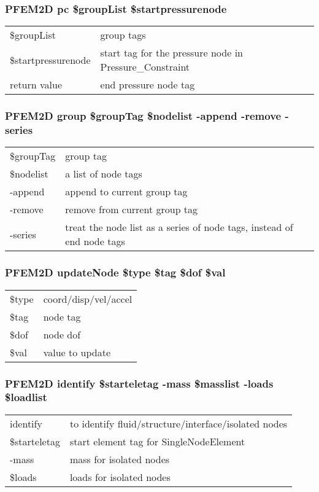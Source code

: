 \documentclass[12pt]{article}
\begin{document}
\subsubsection*{PFEM2D pc \$groupList \$startpressurenode}
\begin{tabular}{ll}
\$groupList & group tags\\
\$startpressurenode & start tag for the pressure node in  Pressure\_Constraint\\
return value & end pressure node tag
\end{tabular}

\subsubsection*{PFEM2D group \$groupTag \$nodelist -append -remove -series}
\begin{tabular}{ll}
\$groupTag & group tag\\
\$nodelist & a list of node tags\\
-append & append to current group tag\\
-remove & remove from current group tag\\
-series & treat the node list as a series of node tags, instead
of end node tags
\end{tabular}

\subsubsection*{PFEM2D updateNode \$type \$tag \$dof \$val}
\begin{tabular}{ll}
\$type & coord/disp/vel/accel\\
\$tag & node tag\\
\$dof & node dof\\
\$val & value to update
\end{tabular}

\subsubsection*{PFEM2D identify \$starteletag -mass \$masslist -loads \$loadlist}
\begin{tabular}{ll}
identify & to identify fluid/structure/interface/isolated nodes\\
\$starteletag & start element tag for SingleNodeElement\\
-mass & mass for isolated nodes\\
\$loads & loads for isolated nodes
\end{tabular}
\end{document}

